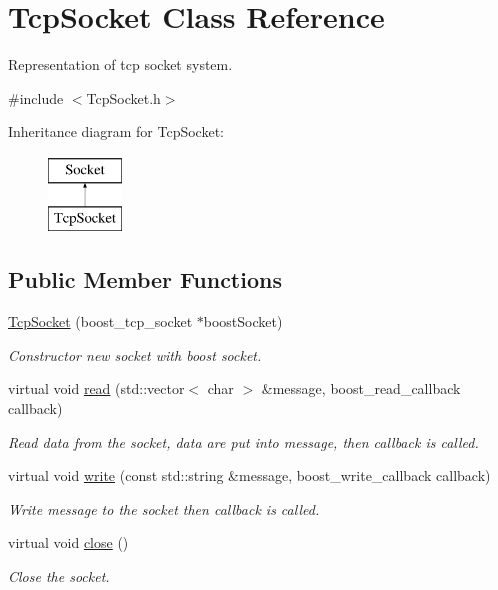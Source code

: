\hypertarget{class_tcp_socket}{\section{Tcp\-Socket Class Reference}
\label{class_tcp_socket}
}


Representation of tcp socket system.  




{\ttfamily \#include $<$Tcp\-Socket.\-h$>$}

Inheritance diagram for Tcp\-Socket\-:\begin{figure}[H]
\begin{center}
\leavevmode
\includegraphics[height=2.000000cm]{class_tcp_socket}
\end{center}
\end{figure}
\subsection*{Public Member Functions}
\begin{DoxyCompactItemize}
\item 
\hyperlink{class_tcp_socket_a4f16ba413f63ae6995d754538bf4bfa3}{Tcp\-Socket} (boost\-\_\-tcp\-\_\-socket $\ast$boost\-Socket)
\begin{DoxyCompactList}\small\item\em Constructor new socket with boost socket. \end{DoxyCompactList}\item 
virtual void \hyperlink{class_tcp_socket_a2e7d82d4f71b93c648f2686cbe02a89d}{read} (std\-::vector$<$ char $>$ \&message, boost\-\_\-read\-\_\-callback callback)
\begin{DoxyCompactList}\small\item\em Read data from the socket, data are put into message, then callback is called. \end{DoxyCompactList}\item 
virtual void \hyperlink{class_tcp_socket_adc03eee685e2cd6704dd2042142d71dd}{write} (const std\-::string \&message, boost\-\_\-write\-\_\-callback callback)
\begin{DoxyCompactList}\small\item\em Write message to the socket then callback is called. \end{DoxyCompactList}\item 
\hypertarget{class_tcp_socket_a68f30d391495a328074eb28f5defdd7d}{virtual void \hyperlink{class_tcp_socket_a68f30d391495a328074eb28f5defdd7d}{close} ()}\label{class_tcp_socket_a68f30d391495a328074eb28f5defdd7d}

\begin{DoxyCompactList}\small\item\em Close the socket. \end{DoxyCompactList}\end{DoxyCompactItemize}

